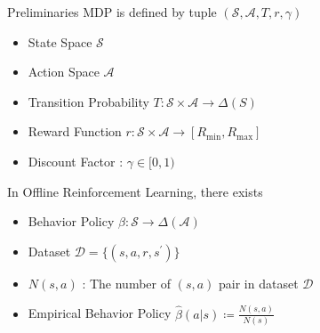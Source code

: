 \documentclass[11pt]{beamer}
\newcommand{\mbb}[1]{\mathbb{#1}}
\newcommand{\mc}[1]{\mathcal{#1}}
\begin{document}
\begin{frame}{Preliminaries}
    MDP is defined by tuple $(\mc{S}, \mc{A}, T, r, \gamma)$
    \begin{itemize}
        \item State Space $\mc{S}$
        \item Action Space $\mc{A}$
        \item Transition Probability $T: \mc{S} \times \mc{A} \to \Delta(S)$
        \item Reward Function $r : \mc{S} \times \mc{A} \to [R_{\text{min}}, R_{\text{max}}]$
        \item Discount Factor : $\gamma \in [0,1)$
    \end{itemize}
    In Offline Reinforcement Learning, there exists
    \begin{itemize}
        \item Behavior Policy $\beta: \mc{S} \to \Delta(\mc{A})$
        \item Dataset $\mc{D} = \{(s,a,r,s^\prime)\}$
        \item $N(s,a)$ : The number of $(s,a)$ pair in dataset $\mc{D}$
        \item Empirical Behavior Policy $\hat{\beta}(a|s) \coloneqq \frac{N(s, a)}{N(s)}$
    \end{itemize}
\end{frame}



\end{document}
